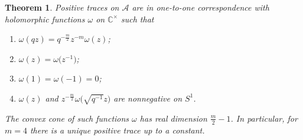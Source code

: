 \documentclass[pdftex]{sigma}
\newcommand\CC{\mathbb{C}}
\newcommand{\mc}{\mathcal}
\numberwithin{equation}{section}
\newtheorem{Theorem}{Theorem}[section]
\theoremstyle{definition}
\begin{document}
 \begin{Theorem}
 \label{ThrAnswerKTheory}
 Positive traces on $\mc{A}$ are in one-to-one correspondence with holomorphic functions $\omega$ on $\CC^{\times}$ such that
 \begin{enumerate}\itemsep=0pt
 \item[$(1)$] $\omega(qz)=q^{-\frac{m}{2}}z^{-m}\omega(z)$;
 \item[$(2)$] $\omega(z)=\omega\bigl(z^{-1}\bigr)$;
 \item[$(3)$] $\omega(1)=\omega(-1)=0$;
 \item[$(4)$] $\omega(z)$ and $z^{-\frac{m}{2}}\omega\bigl(\sqrt{q^{-1}}z\bigr)$ are nonnegative on $S^1$.
 \end{enumerate}

 The convex cone of such functions $\omega$ has real dimension $\frac{m}{2}-1$. In particular, for $m=4$ there is a unique positive trace up to a constant.
 \end{Theorem}
\end{document}
